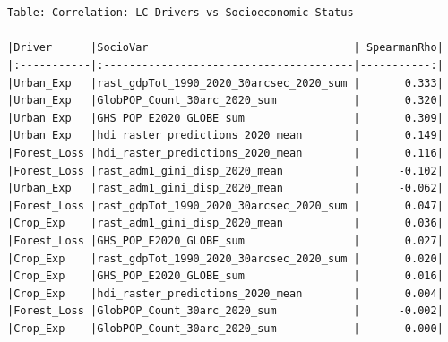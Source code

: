 \documentclass[
  letterpaper,
  DIV=11,
  numbers=noendperiod]{scrartcl}
\begin{document}
\begin{verbatim}


Table: Correlation: LC Drivers vs Socioeconomic Status

|Driver      |SocioVar                                | SpearmanRho|
|:-----------|:---------------------------------------|-----------:|
|Urban_Exp   |rast_gdpTot_1990_2020_30arcsec_2020_sum |       0.333|
|Urban_Exp   |GlobPOP_Count_30arc_2020_sum            |       0.320|
|Urban_Exp   |GHS_POP_E2020_GLOBE_sum                 |       0.309|
|Urban_Exp   |hdi_raster_predictions_2020_mean        |       0.149|
|Forest_Loss |hdi_raster_predictions_2020_mean        |       0.116|
|Forest_Loss |rast_adm1_gini_disp_2020_mean           |      -0.102|
|Urban_Exp   |rast_adm1_gini_disp_2020_mean           |      -0.062|
|Forest_Loss |rast_gdpTot_1990_2020_30arcsec_2020_sum |       0.047|
|Crop_Exp    |rast_adm1_gini_disp_2020_mean           |       0.036|
|Forest_Loss |GHS_POP_E2020_GLOBE_sum                 |       0.027|
|Crop_Exp    |rast_gdpTot_1990_2020_30arcsec_2020_sum |       0.020|
|Crop_Exp    |GHS_POP_E2020_GLOBE_sum                 |       0.016|
|Crop_Exp    |hdi_raster_predictions_2020_mean        |       0.004|
|Forest_Loss |GlobPOP_Count_30arc_2020_sum            |      -0.002|
|Crop_Exp    |GlobPOP_Count_30arc_2020_sum            |       0.000|
\end{verbatim}
\end{document}
